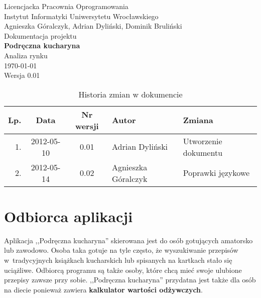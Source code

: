 \documentclass[12pt,leqno, twoside]{mwart}
\begin{document}
\thispagestyle{empty}
\begin{center}
Licencjacka Pracownia Oprogramowania \\ Instytut
Informatyki Uniwersytetu Wrocławskiego \\
\vspace{4cm}
\Large Agnieszka Góralczyk, Adrian Dyliński, Dominik Bruliński \\
\vspace{0.5cm}
\huge Dokumentacja projektu\\ \textbf{Podręczna kucharyna}\\ \Large Analiza rynku\\
\vspace{1cm}
\normalsize \today \\
\vspace{2cm}
\normalsize Wersja 0.01
\end{center}

\newpage


\begin{table}
	\centering
	\caption{Historia zmian w dokumencie}
		\begin{tabular}{|r|c|c|l|l|}
		\hline
		Lp. & Data       & Nr wersji & Autor               & Zmiana \\ \hline
		1.   & 2012-05-10 & 0.01 & Adrian Dyliński & Utworzenie dokumentu \\ \hline
		2.  & 2012-05-14 & 0.02 & Agnieszka Góralczyk & Poprawki językowe \\ \hline
		\end{tabular}
\end{table}

\newpage

\tableofcontents
\newpage
\section{Odbiorca aplikacji}
Aplikacja ,,Podręczna kucharyna'' skierowana jest do osób gotujących amatorsko lub zawodowo. Osoba taka gotuje na tyle często, że wyszukiwanie przepisów w~tradycyjnych książkach kucharskich lub spisanych na kartkach stało się uciążliwe. Odbiorcą programu są także osoby, które chcą mieć swoje ulubione przepisy zawsze przy sobie. ,,Podręczna kucharyna'' przydatna jest także dla osób na diecie ponieważ zawiera \textbf{kalkulator wartości odżywczych}.
\end{document}
